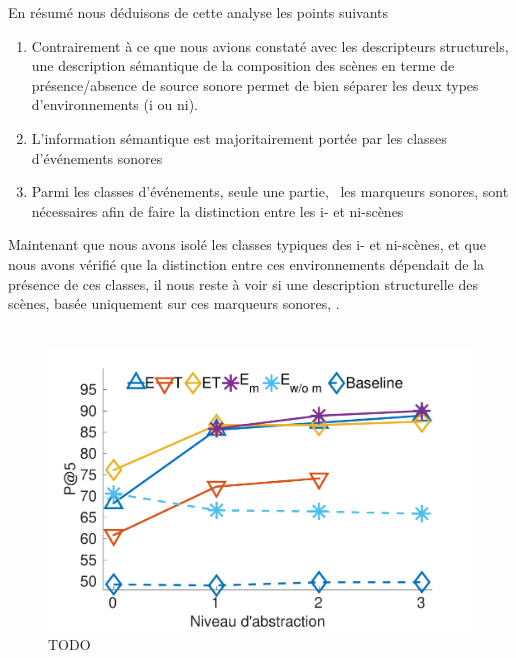 En résumé nous déduisons de cette analyse les points suivants

\begin{enumerate}
\item Contrairement à ce que nous avions constaté avec les descripteurs structurels, une description sémantique de la composition des scènes en terme de présence/absence de source sonore  permet de bien séparer les deux types d'environnements (i ou ni).
\item L'information sémantique est majoritairement portée par les classes d'événements sonores
\item Parmi les classes d'événements, seule une partie, \ie~les marqueurs sonores, sont nécessaires afin de faire la distinction entre les i- et ni-scènes
\end{enumerate}

Maintenant que nous avons isolé les classes typiques des i- et ni-scènes, et que nous avons vérifié que la distinction entre ces environnements dépendait de la présence de ces classes, il nous reste à voir si une description structurelle des scènes, basée uniquement sur ces marqueurs sonores,  . \\

\\

\begin{figure}[t]
        \myfloatalign
        \includegraphics[width=.9\linewidth]{gfxXpUrbanSoundscape/pa5_1}
       \caption[TODO]{TODO}\label{fig:pa5}
\end{figure}

